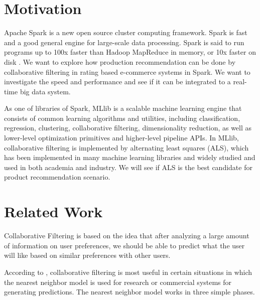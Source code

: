 \documentclass[conference]{IEEEtran}
\begin{document}
\section{Motivation}

Apache Spark is a new open source cluster computing framework. Spark is fast and a good general engine for large-scale data processing. Spark is said to run programs up to 100x faster than Hadoop MapReduce in memory, or 10x faster on disk \cite{ApacheSpark}. We want to explore how production recommendation can be done by collaborative filtering in rating based e-commerce systems in Spark. We want to investigate the speed and performance and see if it can be integrated to a real-time big data system. 

As one of libraries of Spark, MLlib is a scalable machine learning engine that consists of common learning algorithms and utilities, including classification, regression, clustering, collaborative filtering, dimensionality reduction, as well as lower-level optimization primitives and higher-level pipeline APIs. In MLlib, collaborative filtering is implemented by alternating least squares (ALS), which has been implemented in many machine learning libraries and widely studied and used in both academia and industry. We will see if ALS is the best candidate for product recommendation scenario. 

\section{Related Work}

Collaborative Filtering is based on the idea that after analyzing a large amount of information on user preferences, we should be able to predict what the user will like based on similar preferences with other users.

According to \cite{ClusteringItems}, collaborative filtering is most useful in certain situations in which the nearest neighbor model is used for research or commercial systems for generating predictions.  The nearest neighbor model works in three simple phases.  
\end{document}
